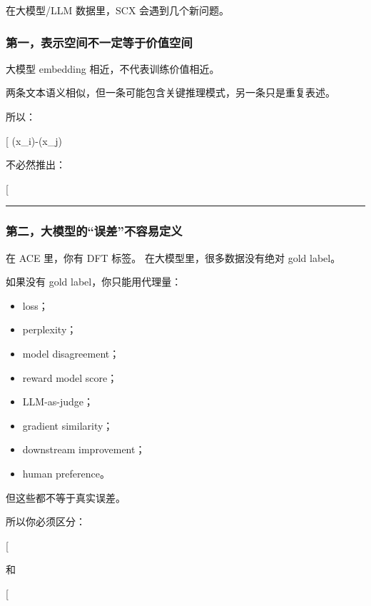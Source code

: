 \documentclass[
  12pt,
]{ctexart}
\providecommand{\tightlist}{%
  \setlength{\itemsep}{0pt}\setlength{\parskip}{0pt}}
\begin{document}
在大模型/LLM 数据里，SCX 会遇到几个新问题。

\subsubsection{第一，表示空间不一定等于价值空间}\label{ux7b2cux4e00ux8868ux793aux7a7aux95f4ux4e0dux4e00ux5b9aux7b49ux4e8eux4ef7ux503cux7a7aux95f4}

大模型 embedding 相近，不代表训练价值相近。

两条文本语义相似，但一条可能包含关键推理模式，另一条只是重复表述。

所以：

{[} \textbar{}\phi(x\_i)-\phi(x\_j)\textbar~\text{小}{]}

不必然推出：

{[} \text{training information is redundant}{]}

\begin{center}\rule{0.5\linewidth}{0.5pt}\end{center}

\subsubsection{第二，大模型的``误差''不容易定义}\label{ux7b2cux4e8cux5927ux6a21ux578bux7684ux8befux5deeux4e0dux5bb9ux6613ux5b9aux4e49}

在 ACE 里，你有 DFT 标签。 在大模型里，很多数据没有绝对 gold label。

如果没有 gold label，你只能用代理量：

\begin{itemize}
\tightlist
\item
  loss；
\item
  perplexity；
\item
  model disagreement；
\item
  reward model score；
\item
  LLM-as-judge；
\item
  gradient similarity；
\item
  downstream improvement；
\item
  human preference。
\end{itemize}

但这些都不等于真实误差。

所以你必须区分：

{[} \text{true error}{]}

和

{[} \text{proxy error / uncertainty}{]}
\end{document}
